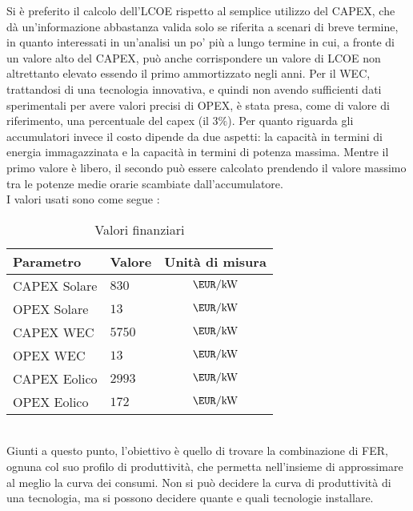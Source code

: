 \documentclass[fleqn,10pt]{SelfArx} %
\begin{document}
Si è preferito il calcolo dell'LCOE rispetto al semplice utilizzo del CAPEX, che dà un'informazione abbastanza valida solo se riferita a scenari di breve termine, in quanto interessati in un'analisi un po' più a lungo termine in cui, a fronte di un valore alto del CAPEX, può anche corrispondere un valore di LCOE non altrettanto elevato essendo il primo ammortizzato negli anni.
Per il WEC, trattandosi di una tecnologia innovativa, e quindi non avendo sufficienti dati sperimentali per avere valori precisi di OPEX, è stata presa, come di valore di riferimento, una percentuale del capex (il $3\%$).
Per quanto riguarda gli accumulatori invece il costo dipende da due aspetti: la capacità in termini di energia immagazzinata e la capacità in termini di potenza massima. Mentre il primo valore è libero, il secondo può essere calcolato prendendo il valore massimo tra le potenze medie orarie scambiate dall'accumulatore. \\
I valori usati sono come segue\cite{IRENA:RenewPowerGen} \cite{OEE:2030Ocean} \cite{OCT:DevelopmentReport}: \\
\begingroup
\renewcommand{\arraystretch}{1.25}
\begin{table}[H]
	\caption{Valori finanziari}
	\centering
	\begin{tabular}{llc}
		\toprule
		Parametro & Valore & Unità di misura \\
		\midrule
		CAPEX Solare & $830$ & $\SI{}{\EUR\per\kW}$ \\
		OPEX Solare & $13$ & $\SI{}{\EUR\per\kW}$ \\
		CAPEX WEC & $5750$ & $\SI{}{\EUR\per\kW}$ \\
		OPEX WEC & $13$ & $\SI{}{\EUR\per\kW}$ \\
		CAPEX Eolico & $2993$ & $\SI{}{\EUR\per\kW}$ \\
		OPEX Eolico & $172$ & $\SI{}{\EUR\per\kW}$ \\
		\bottomrule
	\end{tabular}
	\label{tab:finparameters}
\end{table}
\endgroup \phantom{a} \\
Giunti a questo punto, l'obiettivo è quello di trovare la combinazione di FER, ognuna col suo profilo di produttività, che permetta nell'insieme di approssimare al meglio la curva dei consumi.
Non si può decidere la curva di produttività di una tecnologia, ma si possono decidere quante e quali tecnologie installare. \\
\end{document}
